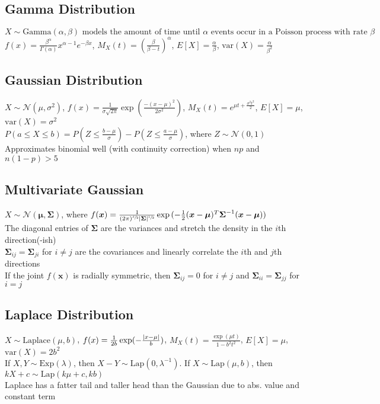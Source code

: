 \documentclass{article}
\newcommand{\V}{\mbox{var}}
\DeclarePairedDelimiter\abs{\lvert}{\rvert}
\begin{document}
\subsection{Gamma Distribution}
$X \sim \mbox{Gamma}(\alpha, \beta)\mbox{ models the amount of time until }\alpha\mbox{ events occur in a Poisson process with rate }\beta$ \\
$f(x) = \frac{\beta ^\alpha}{\Gamma(\alpha)}x^{\alpha-1}e^{-\beta x}$, $M_X(t) = (\frac{\beta}{\beta - t})^\alpha$, $E[X] = \frac{\alpha}{\beta}$, $\V(X) = \frac{\alpha}{\beta ^2}$

\subsection{Gaussian Distribution}
$X\sim \mathcal{N}(\mu, \sigma^2)$, $f(x)=\frac{1}{\sigma \sqrt{2\pi}}\exp (\frac{-(x-\mu)^2}{2\sigma^2})$, $M_X(t) = e^{\mu t + \frac{\sigma^2 t^2}{2}}$, $E[X] = \mu$, $\V(X) = \sigma^2$ \\
$P(a\leq X \leq b) = P(Z \leq \frac{b-\mu}{\sigma}) - P(Z \leq \frac{a-\mu}{\sigma})$, where $Z \sim \mathcal{N}(0, 1)$ \\
Approximates binomial well (with continuity correction) when $np$ and $n(1-p) > 5$ 

\subsection{Multivariate Gaussian}
$X\sim \mathcal{N}(\boldsymbol \mu, \boldsymbol \Sigma)$, where $f(\boldsymbol{x}) = \frac{1}{(2\pi)^{\sfrac{d}{2}} \abs{\boldsymbol \Sigma}^{\sfrac{1}{2}}}\exp{(-\frac{1}{2}(\boldsymbol x-\boldsymbol \mu)^T \boldsymbol \Sigma^{-1} (\boldsymbol x-\boldsymbol \mu))}$ \\
The diagonal entries of $\boldsymbol \Sigma$ are the variances and stretch the density in the $i$th direction(-ish) \\
$\boldsymbol \Sigma_{ij} = \boldsymbol \Sigma_{ji}$ for $i \neq j$ are the covariances and linearly correlate the $i$th and $j$th directions \\
If the joint $f(\boldsymbol x)$ is radially symmetric, then $\boldsymbol \Sigma_{ij} = 0$ for $i \neq j$ and $\boldsymbol \Sigma_{ii} = \boldsymbol \Sigma_{jj}$ for $i = j$

\subsection{Laplace Distribution}
$X \sim \mbox{Laplace}(\mu, b)$, $f(x) = \frac{1}{2b} \exp (-\frac{\abs{x - \mu}}{b})$, $M_X(t) = \frac{\exp(\mu t)}{1 - b^2t^2}$, $E[X] = \mu$, $\V(X) = 2b^2$ \\
If $X, Y \sim \mbox{Exp}(\lambda)$, then $X - Y \sim \mbox{Lap}(0, \lambda ^{-1})$. If $X \sim \mbox{Lap}(\mu, b)$, then $kX + c \sim \mbox{Lap}(k\mu + c, kb)$ \\
Laplace has a fatter tail and taller head than the Gaussian due to abs. value and constant term
\end{document}
